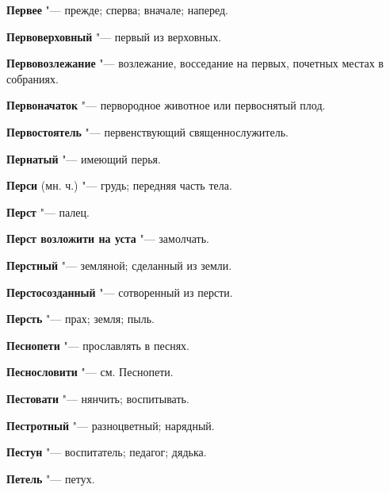 \begin{mymulticols}{2}
\noindent\textbf{Первее} "--- прежде; сперва; вначале; наперед. 




\noindent\textbf{Первоверховный} "--- первый из верховных. 




\noindent\textbf{Первовозлежание} "--- возлежание, восседание на первых, почетных местах в собраниях. 




\noindent\textbf{Первоначаток} "--- первородное животное или первоснятый плод. 




\noindent\textbf{Первостоятель} "--- первенствующий священнослужитель. 




\noindent\textbf{Пернатый} "--- имеющий перья. 




\noindent\textbf{Перси} (мн. ч.) "--- грудь; передняя часть тела. 




\noindent\textbf{Перст} "--- палец. 




\noindent\textbf{Перст возложити на уста} "--- замолчать. 




\noindent\textbf{Перстный} "--- земляной; сделанный из земли. 




\noindent\textbf{Перстосозданный} "--- сотворенный из персти. 




\noindent\textbf{Персть} "--- прах; земля; пыль. 




\noindent\textbf{Песнопети} "--- прославлять в песнях. 




\noindent\textbf{Песнословити} "--- см. Песнопети. 




\noindent\textbf{Пестовати} "--- нянчить; воспитывать. 




\noindent\textbf{Пестротный} "--- разноцветный; нарядный. 




\noindent\textbf{Пестун} "--- воспитатель; педагог; дядька. 




\noindent\textbf{Петель} "--- петух. 





\end{mymulticols}
